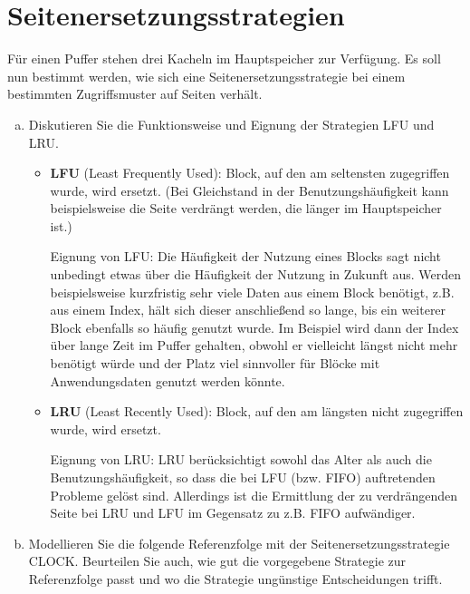 \section{Seitenersetzungsstrategien}\label{Seiten}
Für einen Puffer stehen drei Kacheln im Hauptspeicher zur Verfügung. Es soll nun bestimmt werden, wie sich eine Seitenersetzungsstrategie bei einem bestimmten Zugriffsmuster auf Seiten verhält.

\begin{enumerate}[a)]
    \item Diskutieren Sie die Funktionsweise und Eignung der Strategien LFU und LRU.
\begin{solution}
    \begin{itemize}
        \item \textbf{LFU} (Least Frequently Used):
					Block, auf den am seltensten zugegriffen wurde, wird ersetzt. (Bei Gleichstand in der Benutzungshäufigkeit kann beispielsweise die Seite verdrängt werden, die länger im Hauptspeicher ist.)

            Eignung von LFU: Die Häufigkeit der Nutzung eines Blocks sagt nicht unbedingt etwas über die Häufigkeit der Nutzung in Zukunft aus.
            Werden beispielsweise kurzfristig sehr viele Daten aus einem Block benötigt, z.B. aus einem Index, hält sich dieser anschließend so lange, bis ein weiterer Block ebenfalls so häufig genutzt wurde.
            Im Beispiel wird dann der Index über lange Zeit im Puffer gehalten, obwohl er vielleicht längst nicht mehr benötigt würde und der Platz viel sinnvoller für Blöcke mit Anwendungsdaten genutzt werden könnte.

        \item \textbf{LRU} (Least Recently Used):
            Block, auf den am längsten nicht zugegriffen wurde, wird ersetzt.

            Eignung von LRU: LRU berücksichtigt sowohl das Alter als auch die Benutzungshäufigkeit, so dass die bei LFU (bzw. FIFO) auftretenden Probleme gelöst sind. Allerdings ist die Ermittlung der zu verdrängenden Seite bei LRU und LFU im Gegensatz zu z.B. FIFO aufwändiger.
    \end{itemize}

\end{solution}
\beamertxt{\pagebreak}

	\item
Modellieren Sie die folgende Referenzfolge mit der Seitenersetzungsstrategie CLOCK. Beurteilen Sie auch, wie gut die vorgegebene Strategie zur Referenzfolge passt und wo die Strategie ungünstige Entscheidungen trifft.


\end{enumerate}
